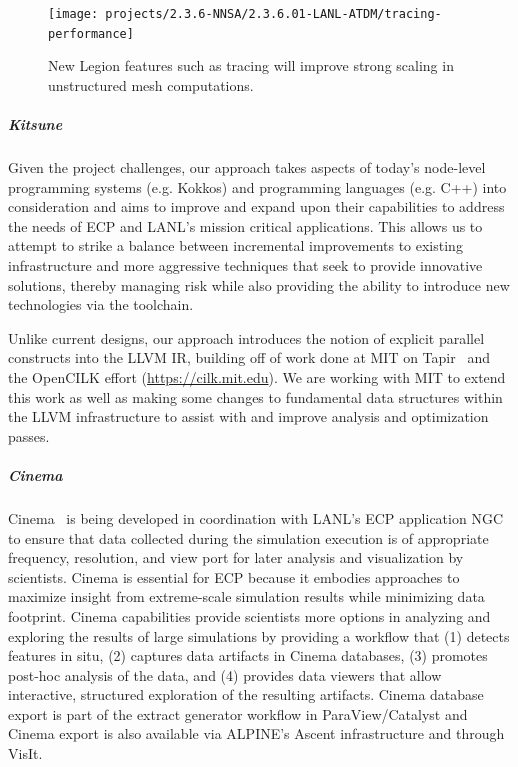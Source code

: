 \begin{figure}[htb]
        \centering
        \texttt{[image: projects/2.3.6-NNSA/2.3.6.01-LANL-ATDM/tracing-performance]}
        \caption{\label{fig:tracing-performance}New Legion features such as tracing will improve strong scaling in unstructured mesh computations.}
\end{figure}


\subparagraph{Kitsune}
Given the project challenges, our approach takes aspects of
today's node-level programming systems (e.g. Kokkos) and
programming languages (e.g. C++) into consideration and aims to improve
and expand upon their capabilities to address the needs of ECP and LANL's
mission critical applications.  This allows us to attempt to strike a
balance between incremental improvements to existing infrastructure
and more aggressive techniques that seek to provide innovative
solutions, thereby managing risk while also providing the ability to
introduce new technologies via the toolchain. 

Unlike current designs, our approach introduces the notion of explicit
parallel constructs into the LLVM IR, building
off of work done at MIT on Tapir~\cite{2.3.6.01:kitsune:Schardl:2017}
and the OpenCILK effort (\url{https://cilk.mit.edu}). We are working with
MIT to extend this work as well as making some changes to fundamental data
structures within the LLVM infrastructure to assist with and improve analysis
and optimization passes. 

\subparagraph{Cinema}
Cinema~\cite{cinema:Ahrens:SC14} is being developed in coordination with
LANL's ECP application NGC to ensure that data collected during the simulation
execution is of appropriate frequency, resolution, and view port for later
analysis and visualization by scientists.  
Cinema is essential for ECP because it embodies approaches to maximize insight from extreme-scale simulation results while minimizing data footprint.
Cinema capabilities provide scientists more options in analyzing and exploring the results of large simulations by providing a workflow that (1) detects features in situ, (2) captures data artifacts in Cinema databases, (3) promotes post-hoc analysis of the data, and (4) provides data viewers that allow interactive, structured exploration of the resulting artifacts. 
Cinema database export is part of the extract generator workflow in ParaView/Catalyst and Cinema export is also available via ALPINE's Ascent infrastructure and through VisIt.   



